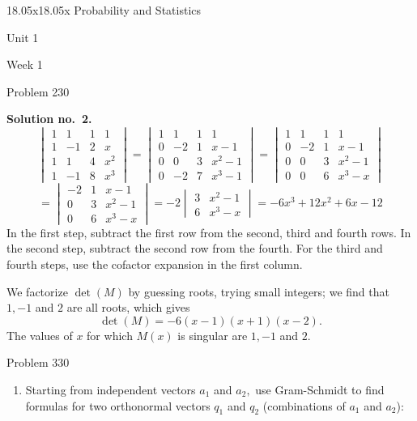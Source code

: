 \begin{edXcourse}{18.05x}{18.05x Probability and Statistics}
\begin{edXchapter}{Unit 1}
\begin{edXsection}{Week 1}
\begin{edXsequential}
\begin{edXproblem}{Problem 2}{30}
\begin{enumerate}
\begin{sol}
\textbf{Solution no.~2.}
$$
\begin{vmatrix}
1 & 1 & 1 & 1\\
1 & -1 & 2 & x\\
1 & 1 & 4 & x^{2}\\
1 & -1 & 8 & x^{3}
\end{vmatrix}
=
\begin{vmatrix}
1& 1& 1 & 1 \\
0 & -2 & 1 & x-1 \\
0 & 0 & 3 & x^2 -1 \\
0 & -2 & 7  & x^3 -1
\end{vmatrix}
= 
\begin{vmatrix}
1& 1& 1 & 1 \\
0 & -2 & 1 & x-1 \\
0 & 0 & 3 & x^2 -1 \\
0 & 0 & 6 & x^3 -x
\end{vmatrix}
$$
$$
=
\begin{vmatrix}
 -2 & 1 & x-1 \\
0 & 3 & x^2 -1 \\
 0 & 6 & x^3 - x
\end{vmatrix}
=
-2
\begin{vmatrix}
3 & x^2 -1 \\
 6 & x^3 - x
\end{vmatrix}
= -6 x^3 +12x^2 + 6x - 12
$$
In the first step, subtract the first row from the second, third and fourth rows. 
In the second step, subtract the second row from the fourth. For the third and fourth steps, use the cofactor expansion in the first column.
\newline

We factorize $\det(M)$ by guessing roots, trying small integers; we find that $1, -1$ and $2$ are all roots, which gives
$$
\det(M) =  -6(x-1)(x+1)(x-2).
$$
The values of $x$ for which $M(x)$ is singular are $1, -1$ and $2$.
\end{sol}

\end{enumerate}

\end{edXproblem}

\newpage

\begin{edXproblem}{Problem 3}{30}

\begin{enumerate}

\item Starting from independent vectors $a_{1}$ and $a_{2},$ use
Gram-Schmidt to find formulas for two orthonormal vectors $q_{1}$ and
$q_{2}$ (combinations of $a_{1}$ and $a_{2}$):


\end{enumerate}
\end{edXproblem}
\end{edXsequential}
\end{edXsection}
\end{edXchapter}
\end{edXcourse}
